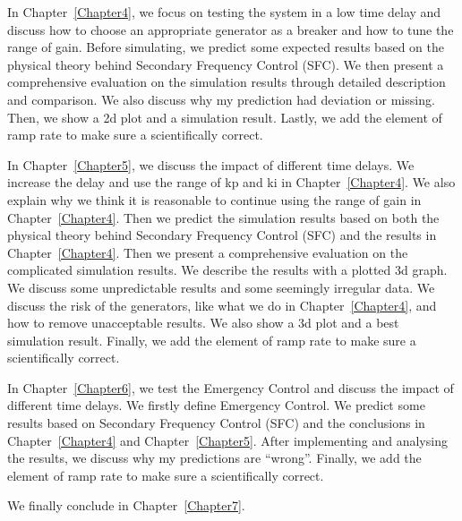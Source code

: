 \begin{description}
    \item In Chapter~\ref{Chapter4}, we focus on testing the system in a low time delay and discuss how to choose an appropriate generator as a breaker and how to tune the range of  gain. Before simulating, we predict some expected results based on the physical theory behind Secondary Frequency Control (SFC). We then present a comprehensive evaluation on the simulation results through detailed description and comparison. We also discuss why my prediction had deviation or missing. Then, we show a 2d plot and a simulation result. Lastly, we add the element of ramp rate to make sure a scientifically correct.
    \item In Chapter~\ref{Chapter5}, we discuss the impact of different time delays. We increase the delay and use the range of kp and ki in Chapter~\ref{Chapter4}. We also explain why we think it is reasonable to continue using the range of gain in Chapter~\ref{Chapter4}. Then we predict the simulation results based on both the physical theory behind Secondary Frequency Control (SFC) and the results in Chapter~\ref{Chapter4}. Then we present a comprehensive evaluation on the complicated simulation results. We describe the results with a plotted 3d graph. We discuss some unpredictable results and some seemingly irregular data. We discuss the risk of the generators, like what we do in Chapter~\ref{Chapter4}, and how to remove unacceptable results. We  also show a 3d plot and a best simulation result. Finally, we add the element of ramp rate to make sure a scientifically correct.
    \item In Chapter~\ref{Chapter6}, we test the Emergency Control and discuss the impact of different time delays. We firstly define Emergency Control. We predict some results based on Secondary Frequency Control (SFC) and the conclusions in Chapter~\ref{Chapter4} and Chapter~\ref{Chapter5}. After implementing and analysing the results, we discuss why my predictions are “wrong”. Finally, we add the element of ramp rate to make sure a scientifically correct.
\end{description}
We finally conclude in Chapter~\ref{Chapter7}. 